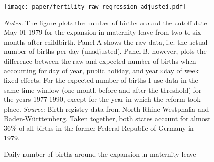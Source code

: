 \documentclass[11pt, a4paper]{article} %
\begin{document}

	\vspace*{\fill}
\begin{figure}[H]\centering
	\caption{Daily number of births around the expansion in maternity leave}\label{fig: fertilitydistr}
	\texttt{[image: paper/fertility\_raw\_regression\_adjusted.pdf]}
	\scriptsize
	\begin{minipage}{0.9 \linewidth}
		\emph{Notes:} The figure plots the number of births around the cutoff date May 01 1979 for the expansion in maternity leave from two to six months after childbirth. Panel A shows the raw data, i.e. the actual number of births per day (unadjusted). Panel B, however, plots the difference between the raw and expected number of births when accounting for day of year, public holiday, and year$\times$day of week fixed effects. For the expected number of births I use data in the same time window (one month before and after the threshold) for the years 1977-1990, except for the year in which the reform took place. \newline\emph{Source:} Birth registry data from North Rhine-Westphalia and Baden-Württemberg. Taken together, both states account for almost 36\% of all births in the former Federal Republic of Germany in 1979.
	\end{minipage}
\end{figure}
\vspace*{\fill}\clearpage
\end{document}
